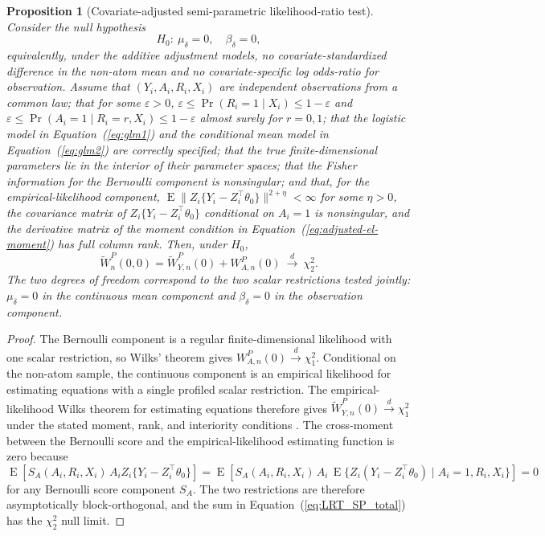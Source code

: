 \documentclass[11pt]{article}
\DeclareMathOperator*{\E}{E}
\newtheorem{proposition}{Proposition}
\begin{document}
\begin{proposition}[Covariate-adjusted semi-parametric likelihood-ratio test]\label{prop:covariate-adjusted-splrt}
Consider the null hypothesis
\[
  H_0:\ \mu_\delta = 0,\quad \beta_\delta = 0,
\]
equivalently, under the additive adjustment models, no covariate-standardized difference in the non-atom mean and no covariate-specific log odds-ratio for observation. Assume that $(Y_i,A_i,R_i,X_i)$ are independent observations from a common law; that for some $\varepsilon>0$, $\varepsilon \leq \Pr(R_i=1\mid X_i) \leq 1-\varepsilon$ and $\varepsilon \leq \Pr(A_i=1\mid R_i=r,X_i) \leq 1-\varepsilon$ almost surely for $r=0,1$; that the logistic model in Equation~(\ref{eq:glm1}) and the conditional mean model in Equation~(\ref{eq:glm2}) are correctly specified; that the true finite-dimensional parameters lie in the interior of their parameter spaces; that the Fisher information for the Bernoulli component is nonsingular; and that, for the empirical-likelihood component, $\E\|Z_i\{Y_i-Z_i^\top\theta_0\}\|^{2+\eta}<\infty$ for some $\eta>0$, the covariance matrix of $Z_i\{Y_i-Z_i^\top\theta_0\}$ conditional on $A_i=1$ is nonsingular, and the derivative matrix of the moment condition in Equation~(\ref{eq:adjusted-el-moment}) has full column rank. Then, under $H_0$,
\[
  \widetilde{W}_n^P(0,0)
  =
  \widetilde{W}_{Y,n}^P(0)+W_{A,n}^P(0)
  \ \overset{d}{\longrightarrow}\ \chi^2_2.
\]
The two degrees of freedom correspond to the two scalar restrictions tested jointly: $\mu_\delta=0$ in the continuous mean component and $\beta_\delta=0$ in the observation component.
\end{proposition}

\begin{proof}
The Bernoulli component is a regular finite-dimensional likelihood with one scalar restriction, so Wilks' theorem gives $W_{A,n}^P(0)\overset{d}{\to}\chi^2_1$. Conditional on the non-atom sample, the continuous component is an empirical likelihood for estimating equations with a single profiled scalar restriction. The empirical-likelihood Wilks theorem for estimating equations therefore gives $\widetilde{W}_{Y,n}^P(0)\overset{d}{\to}\chi^2_1$ under the stated moment, rank, and interiority conditions \citep{owen1991empirical,qin1994empirical}. The cross-moment between the Bernoulli score and the empirical-likelihood estimating function is zero because
\[
  \E\!\left[
    S_A(A_i,R_i,X_i)\,
    A_i Z_i\{Y_i-Z_i^\top\theta_0\}
  \right]
  =
  \E\!\left[
    S_A(A_i,R_i,X_i)\,
    A_i\,\E\{Z_i(Y_i-Z_i^\top\theta_0)\mid A_i=1,R_i,X_i\}
  \right]
  =0
\]
for any Bernoulli score component $S_A$. The two restrictions are therefore asymptotically block-orthogonal, and the sum in Equation~(\ref{eq:LRT_SP_total}) has the $\chi^2_2$ null limit.
\end{proof}
\end{document}
